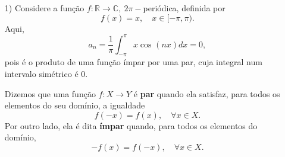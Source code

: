 \documentclass[../pde_notes.tex]{subfiles}
\begin{document}
\begin{example}
	\begin{itemize}
		\item[1)] Considere a função \(f:\mathbb{R}\rightarrow \mathbb{C},\: 2\pi-\)periódica, definida por
		      \[
			      f(x)=x,\quad x\in [-\pi, \pi).
		      \]
		      Aqui,
		      \[
			      a_{n} = \frac{1}{\pi }\int_{-\pi }^{\pi }x\cos^{}{(nx)}dx = 0,
		      \]
		      pois é o produto de uma função ímpar por uma par, cuja integral num intervalo simétrico é 0.
		      \begin{tcolorbox}[
				      skin = enhanced,
				      title=Lembrete!,
				      after title*={\hfill Funções Pares e Ímpares},
				      fonttitle=\bfseries,
				      sharp corners=downhill,
				      colframe=black,
				      colbacktitle=yellow!75!white,
				      colback=yellow!30,
				      coltitle=black,
				      colbacklower=black,
				      drop large lifted shadow
			      ]
			      Dizemos que uma função \(f:X\rightarrow Y\) é \textbf{par} quando ela satisfaz, para todos os elementos do seu domínio, a igualdade
			      \[
				      f(-x) = f(x),\quad \forall x\in X.
			      \]
			      Por outro lado, ela é dita \textbf{ímpar} quando, para todos os elementos do domínio,
			      \[
				      -f(x) = f(-x),\quad \forall x\in X.
			      \]
		      \end{tcolorbox}


\end{itemize}
\end{example}
\end{document}
